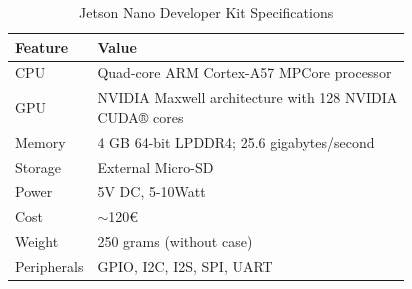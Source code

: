 \begin{table}[H]
  \caption[]{Jetson Nano Developer Kit Specifications}
  \label{tab:2}
  \centering
  \begin{tabular}{ll}
      \hline
      \textbf{Feature} & \textbf{Value}  \\
      \hline
          CPU & Quad-core ARM Cortex-A57 MPCore processor\\
          GPU & \Centerstack{NVIDIA Maxwell architecture with 128 NVIDIA\\ CUDA® cores} \\
          Memory & 4 GB 64-bit LPDDR4; 25.6 gigabytes/second \\
          Storage & External Micro-SD \\  
          Power & 5V DC, 5-10Watt \\
          Cost & $\sim$120€\\
          Weight & 250 grams (without case)\\
          Peripherals & GPIO, I2C, I2S, SPI, UART \\
          \hline
  \end{tabular}
\end{table}